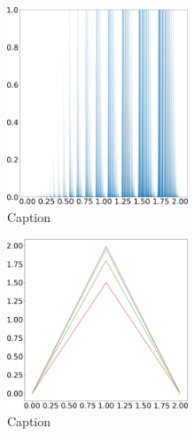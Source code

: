 \begin{figure}[H]
    \includegraphics[width=0.48\textwidth]{figure/tent_tilted_shadow_density_0.7.png}
    \caption{Caption}
    \label{fig:tent_tilted_shadow}
\end{figure}

\begin{figure}[H]
    \centering
    \includegraphics[width=0.48\textwidth]{figure/squashed_tent_map.png}
    \caption{Caption}
    \label{fig:tent_squashed}
\end{figure}

